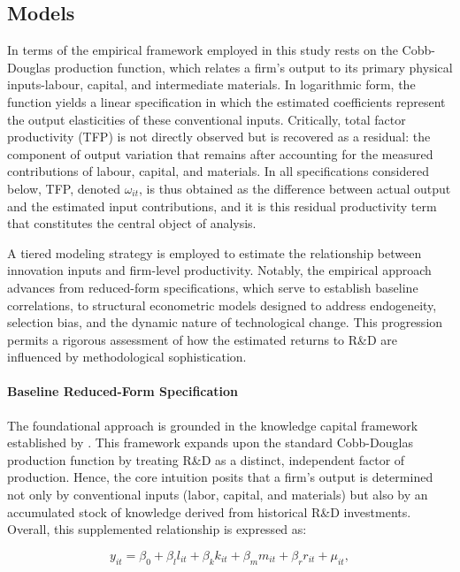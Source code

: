 \documentclass[a4paper, 12pt]{article}
\begin{document}
\subsection{Models}
\label{subsec:methods_models}

In terms of the empirical framework employed in this study rests on the Cobb-Douglas production function, which relates a firm's output to its primary physical inputs-labour, capital, and intermediate materials. In logarithmic form, the function yields a linear specification in which the estimated coefficients represent the output elasticities of these conventional inputs. Critically, total factor productivity (TFP) is not directly observed but is recovered as a residual: the component of output variation that remains after accounting for the measured contributions of labour, capital, and materials. In all specifications considered below, TFP, denoted $\omega_{it}$, is thus obtained as the difference between actual output and the estimated input contributions, and it is this residual productivity term that constitutes the central object of analysis.

A tiered modeling strategy is employed to estimate the relationship between innovation inputs and firm-level productivity. Notably, the empirical approach advances from reduced-form specifications, which serve to establish baseline correlations, to structural econometric models designed to address endogeneity, selection bias, and the dynamic nature of technological change. This progression permits a rigorous assessment of how the estimated returns to R\&D are influenced by methodological sophistication.

\paragraph{Baseline Reduced-Form Specification}

The foundational approach is grounded in the knowledge capital framework established by \textcite{griliches1979issues}. This framework expands upon the standard Cobb-Douglas production function by treating R\&D as a distinct, independent factor of production. Hence, the core intuition posits that a firm's output is determined not only by conventional inputs (labor, capital, and materials) but also by an accumulated stock of knowledge derived from historical R\&D investments. Overall, this supplemented relationship is expressed as:

\begin{equation}
y_{it} = \beta_0 + \beta_l l_{it} + \beta_k k_{it} + \beta_m m_{it} + \beta_r r_{it} + \mu_{it},
\end{equation}
\end{document}
